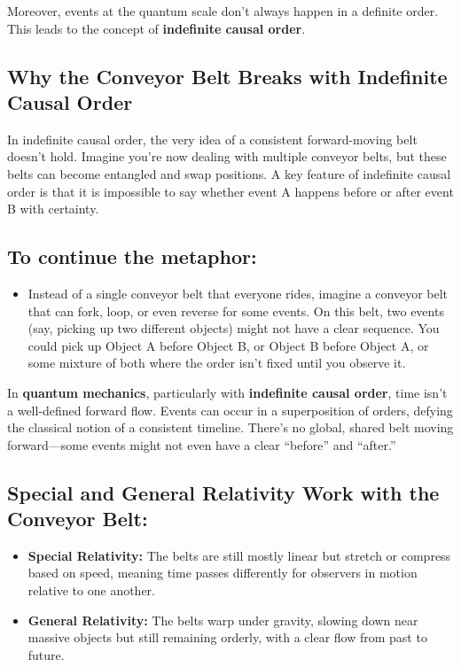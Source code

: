 \documentclass[../../../OAE-SPEC-MAIN.tex]{subfiles}
\begin{document}
Moreover, events at the quantum scale don’t always happen in a definite order. This leads to the concept of \textbf{indefinite causal order}.

\subsection{Why the Conveyor Belt Breaks with Indefinite Causal Order}

In indefinite causal order, the very idea of a consistent forward-moving belt doesn’t hold. Imagine you're now dealing with multiple conveyor belts, but these belts can become entangled and swap positions. A key feature of indefinite causal order is that it is impossible to say whether event A happens before or after event B with certainty.

\subsection*{To continue the metaphor:}

\begin{itemize}[leftmargin=1.5em]
\item Instead of a single conveyor belt that everyone rides, imagine a conveyor belt that can fork, loop, or even reverse for some events. On this belt, two events (say, picking up two different objects) might not have a clear sequence. You could pick up Object A before Object B, or Object B before Object A, or some mixture of both where the order isn't fixed until you observe it.
\end{itemize}

In \textbf{quantum mechanics}, particularly with \textbf{indefinite causal order}, time isn’t a well-defined forward flow. Events can occur in a superposition of orders, defying the classical notion of a consistent timeline. There’s no global, shared belt moving forward—some events might not even have a clear ``before'' and ``after.''

\subsection*{Special and General Relativity Work with the Conveyor Belt:}

\begin{itemize}[leftmargin=1.5em]
\item \textbf{Special Relativity:} The belts are still mostly linear but stretch or compress based on speed, meaning time passes differently for observers in motion relative to one another.
\item \textbf{General Relativity:} The belts warp under gravity, slowing down near massive objects but still remaining orderly, with a clear flow from past to future.
\end{itemize}
\end{document}
